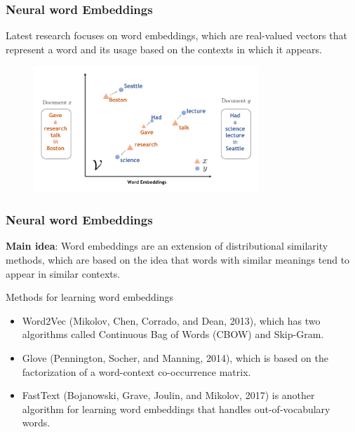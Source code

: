 \documentclass[
    11pt, %
    aspectratio=169, %
]{beamer}
\begin{document}
\begin{frame}
    \frametitle{Neural word Embeddings}

    Latest research focuses on word embeddings, which are real-valued vectors that represent a word and its usage based on the contexts in which it appears. 
    \begin{figure}
        \centering
        \includegraphics[width=8.5cm]{Images/embeds.png}
        \label{fig:my_label}
    \end{figure}
    
\end{frame}

\begin{frame}
    \frametitle{Neural word Embeddings}

    \textbf{Main idea}:
     Word embeddings are an extension of distributional similarity methods, which are based on the idea that words with similar meanings tend to appear in similar contexts.

     \begin{exampleblock}{Methods for learning word embeddings}
         \begin{itemize}
             \item Word2Vec (Mikolov, Chen, Corrado, and Dean, 2013), which has two algorithms called Continuous Bag of Words (CBOW) and Skip-Gram.
             \item Glove (Pennington, Socher, and Manning, 2014), which is based on the factorization of a word-context co-occurrence matrix.
             \item FastText (Bojanowski, Grave, Joulin, and Mikolov, 2017) is another algorithm for learning word embeddings that handles out-of-vocabulary words.
         \end{itemize}
     \end{exampleblock}
    
\end{frame}
\end{document}
